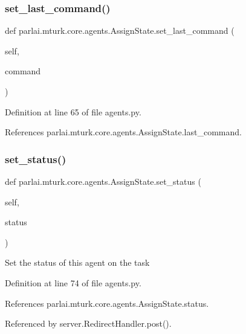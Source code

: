 \subsubsection{\texorpdfstring{set\+\_\+last\+\_\+command()}{set\_last\_command()}}
{\footnotesize\ttfamily def parlai.\+mturk.\+core.\+agents.\+Assign\+State.\+set\+\_\+last\+\_\+command (\begin{DoxyParamCaption}\item[{}]{self,  }\item[{}]{command }\end{DoxyParamCaption})}



Definition at line 65 of file agents.\+py.



References parlai.\+mturk.\+core.\+agents.\+Assign\+State.\+last\+\_\+command.

\mbox{\label{classparlai_1_1mturk_1_1core_1_1agents_1_1AssignState_a7cd23ff37c1c1e0c6d8548f77a8d078c}} 
\subsubsection{\texorpdfstring{set\+\_\+status()}{set\_status()}}
{\footnotesize\ttfamily def parlai.\+mturk.\+core.\+agents.\+Assign\+State.\+set\+\_\+status (\begin{DoxyParamCaption}\item[{}]{self,  }\item[{}]{status }\end{DoxyParamCaption})}

\begin{DoxyVerb}Set the status of this agent on the task\end{DoxyVerb}
 

Definition at line 74 of file agents.\+py.



References parlai.\+mturk.\+core.\+agents.\+Assign\+State.\+status.



Referenced by server.\+Redirect\+Handler.\+post().


